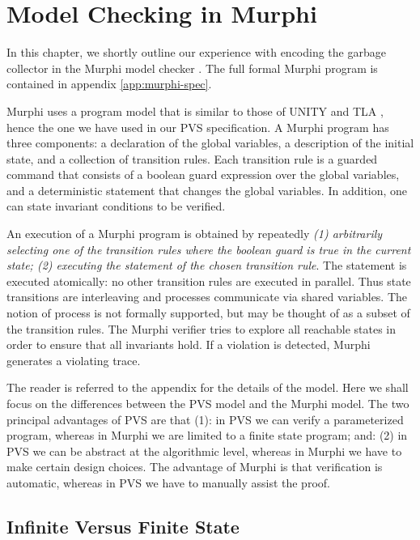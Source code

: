          
\chapter{Model Checking in Murphi}

In this chapter, we shortly outline our experience with encoding the
garbage collector in the Murphi model checker \cite{MDC:Murphi}.
The full  formal Murphi program is contained
in appendix \ref{app:murphi-spec}.

Murphi uses a  program  model  that is  similar   to those  of   UNITY
\cite{CM:UNITY} and TLA \cite{TLA:TOPLAS94}, hence the  one we have used in
our PVS   specification.  A Murphi  program  has three   components: a
declaration  of the  global variables,  a description  of the  initial
state, and a collection of  transition rules.  Each transition rule is
a guarded command that consists of a boolean guard expression over the
global  variables,  and  a deterministic  statement   that changes the
global variables.  In addition, one  can state invariant conditions to
be verified.

An execution of a Murphi program is obtained by repeatedly {\it (1)
arbitrarily selecting  one of the transition  rules  where the boolean
guard is true in the current state; (2) executing the statement of the
chosen transition  rule}\@.  The statement  is executed atomically: no
other  transition  rules  are   executed   in  parallel.   Thus  state
transitions  are interleaving  and processes  communicate  via  shared
variables.  The notion of process is not  formally  supported, but may
be thought  of  as  a  subset  of  the transition  rules.   The Murphi
verifier tries to explore all reachable states in order to ensure that
all  invariants hold.  If a violation is detected,  Murphi generates a
violating trace.

The reader  is referred to the  appendix for the details of the model.
Here we shall  focus on the differences between the PVS model  and the
Murphi model. The two principal advantages of PVS are that (1): in PVS
we can  verify  a  parameterized program,  whereas  in  Murphi we  are
limited to a finite state program; and: (2) in PVS we can be  abstract
at  the algorithmic level,  whereas  in Murphi we have to make certain
design choices.  The  advantage  of  Murphi  is that  verification  is
automatic, whereas in PVS we have to manually assist the proof.


\section*{Infinite Versus Finite State}

